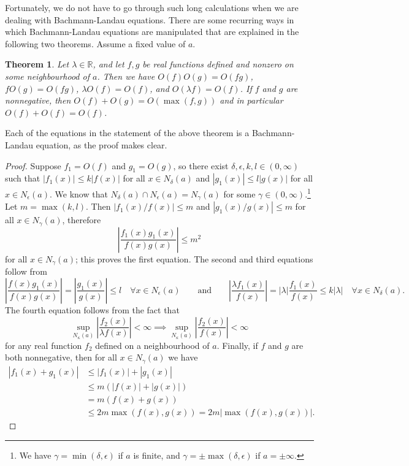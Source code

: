 \documentclass{article}
\newtheorem{theorem}{Theorem}
\theoremstyle{definition}
\newcommand\RR{\mathbb R}
\newcommand\abs[1]{\left\lvert#1\right\rvert}
\begin{document}
Fortunately, we do not have to go through such long calculations when we are dealing with Bachmann-Landau equations.
There are some recurring ways in which Bachmann-Landau equations are manipulated that are explained in the following two theorems.
Assume a fixed value of \(a\).

\begin{theorem}
    Let \(\lambda\in\RR\), and let \(f,g\) be real functions defined and nonzero on some neighbourhood of \(a\).
    Then we have \(O(f)O(g) = O(fg)\), \(fO(g) = O(fg)\), \(\lambda O(f) = O(f)\), and \(O(\lambda f) = O(f)\).
    If \(f\) and \(g\) are nonnegative, then \(O(f) + O(g) = O(\max(f, g))\) and in particular \(O(f) + O(f) = O(f)\).
\end{theorem}

Each of the equations in the statement of the above theorem is a Bachmann-Landau equation, as the proof makes clear.

\begin{proof}
    Suppose \(f_1 = O(f)\) and \(g_1 = O(g)\), so there exist \(\delta,\epsilon,k,l\in(0,\infty)\) such that \(\abs{f_1(x)} \leq k\abs{f(x)}\) for all \(x\in N_{\delta}(a)\) and \(\abs{g_1(x)} \leq l\abs{g(x)}\) for all \(x\in N_{\epsilon}(a)\).
    We know that \(N_{\delta}(a) \cap N_{\epsilon}(a) = N_{\gamma}(a)\) for some \(\gamma\in(0,\infty)\).\footnote{We have \(\gamma = \min(\delta,\epsilon)\) if \(a\) is finite, and \(\gamma = \pm\max(\delta,\epsilon)\) if \(a=\pm\infty\).}
    Let \(m=\max(k,l)\).
    Then \(\abs{f_1(x)/f(x)} \leq m\) and \(\abs{g_1(x)/g(x)} \leq m\) for all \(x\in N_{\gamma}(a)\), therefore
    \[\abs{\frac{f_1(x)g_1(x)}{f(x)g(x)}} \leq m^2\]
    for all \(x\in N_{\gamma}(a)\); this proves the first equation.
    The second and third equations follow from
    \[\abs{\frac{f(x)g_1(x)}{f(x)g(x)}} = \abs{\frac{g_1(x)}{g(x)}} \leq l\quad\forall x\in N_{\epsilon}(a) \qquad \text{and} \qquad \abs{\frac{\lambda f_1(x)}{f(x)}} = \abs{\lambda}\frac{f_1(x)}{f(x)} \leq k\abs{\lambda}\quad\forall x\in N_{\delta}(a).\]
    The fourth equation follows from the fact that
    \[\sup_{N_{\kappa}(a)} \abs{\frac{f_2(x)}{\lambda f(x)}} < \infty \implies \sup_{N_{\kappa}(a)} \abs{\frac{f_2(x)}{f(x)}} < \infty\]
    for any real function \(f_2\) defined on a neighbourhood of \(a\).
    Finally, if \(f\) and \(g\) are both nonnegative, then for all \(x\in N_{\gamma}(a)\) we have
    \begin{align*}
        \abs{f_1(x)+g_1(x)} &\leq \abs{f_1(x)} + \abs{g_1(x)} \\
        &\leq m(\abs{f(x)} + \abs{g(x)}) \\
        &= m(f(x)+g(x)) \\
        &\leq 2m\max(f(x),g(x)) = 2m\abs{\max(f(x), g(x))}.
    \end{align*}
\end{proof}
\end{document}
